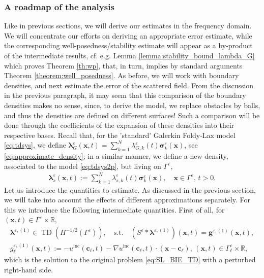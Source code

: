 \documentclass[]{article}
\numberwithin{equation}{section}
\numberwithin{theorem}{section}
\numberwithin{lemma}{section}
\numberwithin{corollary}{section}
\numberwithin{proposition}{section}
\numberwithin{definition}{section}
\newcommand{\bx}{\boldsymbol{x}}
\newcommand{\re}{\varepsilon}
\renewcommand{\vec}{\boldsymbol}
\begin{document}
	\subsubsection{A roadmap of the analysis}
	Like in previous sections, we will derive our estimates in the frequency domain. We will concentrate our efforts on deriving an appropriate error estimate, while the corresponding well-posedness/stability estimate will appear as a by-product of the intermediate results, cf. e.g. Lemma \ref{lemma:stability_bound_lambda_G} which proves Theorem \ref{th:wp}, that, in turn, implies by standard arguments Theorem \ref{theorem:well_posedness}. As before, we will work with boundary densities, and next estimate the error of the scattered field. From the discussion in the previous paragraph, it may seem that this comparison of the boundary densities makes no sense, since, to derive the model, we replace obstacles by balls, and thus the densities are defined on different surfaces! Such a comparison will be done through the coefficients of the expansion of these densities into their respective bases. Recall that, for the 'standard' Galerkin Foldy-Lax model \eqref{eq:tdsys}, we define $\vec{\lambda}_G^{\re}(\vec{x},t)=\sum\limits_{k=1}^N\lambda_{G,k}^{\re}(t)\vec{\sigma}^{\re}_k(\vec{x})$, see \eqref{eq:approximate_density}; in a similar manner, we define a new density, associated to the model \eqref{eq:tdsys2p}, but living on $\Gamma^{\re}$, 
	\begin{align*}%
		\vec{\lambda}_s^{\re}(\vec{x},t):=\sum\limits_{k=1}^N\lambda_{s,k}^{\re}(t)\vec{\sigma}^{\re}_k(\vec{x}), \quad \vec{x}\in \Gamma^{\re}, \, t>0.
	\end{align*}
	Let us introduce the quantities to estimate. As discussed in the previous section, we will take into account the effects of different approximations separately.  
	For this we introduce the following intermediate quantities. First of all, for $(\bx, t) \in \Gamma^{\re} \times \mathbb{R}$,
	\begin{align}
		\label{eq:dens_pert}
		\vec{\lambda}^{\re,(1)}\in \operatorname{TD}(H^{-1/2}(\Gamma^{\re})), \quad \text{s.t.}\quad ({S}^{\re}*\vec{\lambda}^{\re,(1)})(\bx, t)=	\vec{g}^{\re,(1)}(\vec{x},t), \\
		\nonumber
		g^{\re,(1)}_{\ell}(\vec{x},t):=-u^{\operatorname{inc}}(\vec{c}_{\ell},t)-\nabla u^{\operatorname{inc}}(\vec{c}_{\ell},t)\cdot (\vec{x}-\vec{c}_{\ell}),\, (\vec{x}, t) \in \Gamma^{\re}_{\ell} \times \mathbb{R},
	\end{align}
	which is the solution to the original problem \eqref{eq:SL_BIE_TD} with a perturbed right-hand side. 
\end{document}
